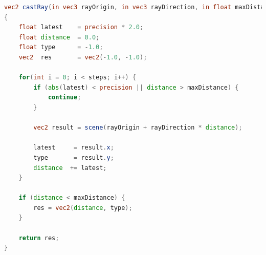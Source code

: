 \begin{lstlisting}[language=GLSL,caption={Umsetzung des Sphere Tracings in
        GLSL.},label={alg:glsl_sphere_tracing},captionpos=b,emph={castRay}]
vec2 castRay(in vec3 rayOrigin, in vec3 rayDirection, in float maxDistance, in float precision, in int steps)
{
    float latest    = precision * 2.0;
    float distance  = 0.0;
    float type      = -1.0;
    vec2  res       = vec2(-1.0, -1.0);

    for(int i = 0; i < steps; i++) {
        if (abs(latest) < precision || distance > maxDistance) {
            continue;
        }

        vec2 result = scene(rayOrigin + rayDirection * distance);

        latest     = result.x;
        type       = result.y;
        distance  += latest;
    }

    if (distance < maxDistance) {
        res = vec2(distance, type);
    }

    return res;
}
\end{lstlisting}

